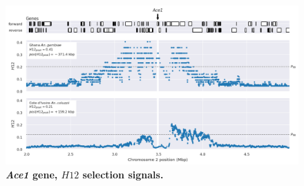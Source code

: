 \documentclass[a4paper,11pt,abstracton,hidelinks]{scrartcl}
\begin{document}
%
%
%
%
%
%


\clearpage


\begin{figure}[t!]
	\begin{center}
		\includegraphics*[width=1\linewidth,center]{artwork/locus_ace1_h12_pdist.png}
	\end{center}
	\caption[\textit{Ace1} gene, $H12$ selection signals]{
	\textbf{\textit{Ace1} gene, $H12$ selection signals.}
	} 
	\label{fig:locus_ace1_h12}
\end{figure}
\end{document}
